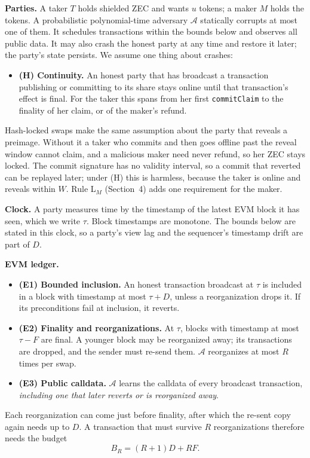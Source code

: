 \documentclass[10pt,letterpaper]{article}
\makeatletter
\renewcommand\section{\@startsection{section}{1}{\z@}{-1.3em}{0.45em}{\normalfont\large\bfseries}}
\theoremstyle{plain}
\theoremstyle{definition}
\newcommand{\fn}[1]{\texttt{#1}}
\makeatother
\begin{document}
\section{Model and Goals}

\textbf{Parties.} A taker $T$ holds shielded ZEC and wants $u$ tokens; a maker $M$ holds the
tokens. A probabilistic polynomial-time adversary $\mathcal{A}$ statically corrupts at most one of
them. It schedules transactions within the bounds below and observes all public data. It may also
crash the honest party at any time and restore it later; the party's state persists. We assume
one thing about crashes:
\begin{itemize}\setlength\itemsep{0.05em}
\item \textbf{(H) Continuity.} An honest party that has broadcast a transaction publishing or
committing to its share stays online until that transaction's effect is final. For the taker this
spans from her first \fn{commitClaim} to the finality of her claim, or of the maker's refund.
\end{itemize}
Hash-locked swaps make the same assumption about the party that reveals a preimage. Without it a
taker who commits and then goes offline past the reveal window cannot claim, and a malicious maker
need never refund, so her ZEC stays locked. The commit signature has no validity interval, so a
commit that reverted can be replayed later; under (H) this is harmless, because the taker is
online and reveals within $W$. Rule L$_M$ (Section~4) adds one requirement for the maker.

\textbf{Clock.} A party measures time by the timestamp of the latest EVM block it has seen, which
we write $\tau$. Block timestamps are monotone. The bounds below are stated in this clock, so a
party's view lag and the sequencer's timestamp drift are part of $D$.

\textbf{EVM ledger.}
\begin{itemize}\setlength\itemsep{0.05em}
\item \textbf{(E1) Bounded inclusion.} An honest transaction broadcast at $\tau$ is included in a
block with timestamp at most $\tau + D$, unless a reorganization drops it. If its preconditions
fail at inclusion, it reverts.
\item \textbf{(E2) Finality and reorganizations.} At $\tau$, blocks with timestamp at most
$\tau - F$ are final. A younger block may be reorganized away; its transactions are dropped, and
the sender must re-send them. $\mathcal{A}$ reorganizes at most $R$ times per swap.
\item \textbf{(E3) Public calldata.} $\mathcal{A}$ learns the calldata of every broadcast
transaction, \emph{including one that later reverts or is reorganized away}.
\end{itemize}
Each reorganization can come just before finality, after which the re-sent copy again needs up
to $D$. A transaction that must survive $R$ reorganizations therefore needs the budget
\[
B_R = (R+1)D + RF.
\]
\end{document}
